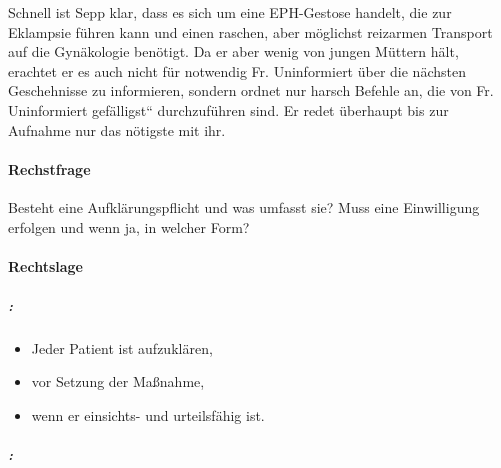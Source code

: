Schnell ist Sepp klar, dass es sich um eine  EPH-Gestose handelt, die zur
Eklampsie f\"uhren kann und einen raschen, aber m\"oglichst reizarmen
Transport auf die Gynäkologie ben\"otigt. Da er aber wenig von jungen
M\"uttern hält, erachtet er es auch nicht f\"ur notwendig Fr.
Uninformiert \"uber die nächsten Geschehnisse zu informieren, sondern
ordnet nur harsch Befehle an, die von Fr. Uninformiert
{\quotedblbase}gefälligst{\textquotedblleft} durchzuf\"uhren sind. Er
redet \"uberhaupt bis zur Aufnahme nur das n\"otigste mit ihr.

\paragraph*{Rechstfrage}
Besteht eine Aufklärungspflicht und was umfasst sie? Muss eine
Einwilligung erfolgen und wenn ja, in welcher Form?

\paragraph*{Rechtslage}

\subparagraph*{:}

\begin{itemize}
	\item {\mdseries
	Jeder Patient ist aufzuklären,}

	\item {\mdseries
	vor Setzung der Ma{\ss}nahme,}

	\item wenn er einsichts- und urteilsfähig ist.

\end{itemize}

\subparagraph*{:}

